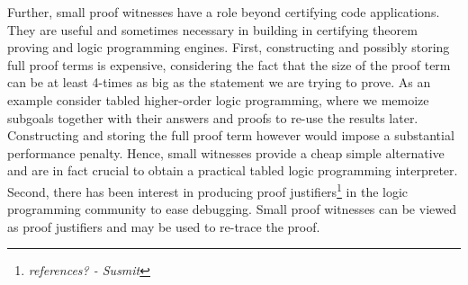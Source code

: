 \documentclass{acmconf}
\newcommand{\ednote}[1]{\footnote{\it #1}}
\begin{document}



Further, small proof witnesses have a role beyond certifying code
applications. They are useful and sometimes necessary in building in
certifying theorem proving and logic programming engines. First,
constructing and possibly storing full proof terms is expensive,
considering the fact that the size of the proof term can be at least
4-times as big as the statement we are trying to prove. As an example
consider tabled higher-order logic programming, where we memoize
subgoals together with their answers and proofs to re-use the results
later. Constructing and storing the full proof term however would
impose a substantial performance penalty. Hence, small witnesses
provide a cheap simple alternative and are in fact crucial to obtain a
practical tabled logic programming interpreter. Second, there has been
interest in producing proof justifiers\ednote{references? - Susmit} in
the logic programming community to ease debugging. Small proof
witnesses can be viewed as proof justifiers and may be used to
re-trace the proof.
\end{document}
